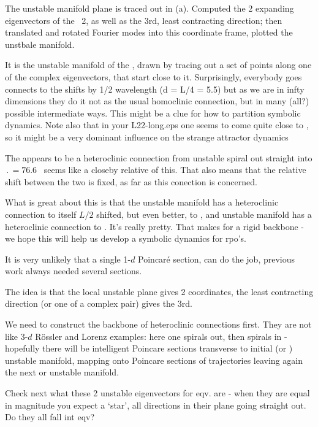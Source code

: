 The unstable manifold plane
is traced out in (a).
Computed the 2 expanding eigenvectors of the
\eqv\ {\nameit}2, as well as the 3rd, least contracting direction; then
translated and rotated Fourier modes into this coordinate frame,
plotted the unstbale manifold.


 It is the unstable manifold of the 
{\eqv}, drawn by tracing out a set of points along one of the complex
eigenvectors, that start close to it. Surprisingly, everybody goes connects
to the  shifts by 1/2 wavelength (d = L/4 = 5.5) but as we are in
infty dimensions they do it not as the usual homoclinic connection, but in
many (all?) possible intermediate ways. This might be a clue for how to
partition symbolic dynamics. Note also that in your L22-long.eps one seems
to come quite close to  {\eqv}, so it might be a very dominant
influence on the strange attractor dynamics


The appears to be a heteroclinic connection from  
{\eqv}
unstable spiral out straight into  {\eqv}
$\period{} = 76.6$ \rpo\ seems like a closeby
relative of this.
That also means that the relative shift between the two {\eqva} is
fixed, as far as this conection is concerned.

What is great about
this is that the  unstable manifold has a heteroclinic connection to itself 
$L/2$ shifted, but
even better, to , and  unstable manifold has a heteroclinic
connection to . 
It's really pretty. That makes for a rigid backbone - 
we hope this will help us develop a symbolic dynamics for rpo's.

It is very unlikely 
that a single 1-$d$ Poincar\'e section,
can do the job, 
previous work
always needed several sections.

The idea is that the local unstable plane gives 2 coordinates, the
least contracting direction (or one of a complex pair) gives the 3rd.

We need to construct the backbone of heteroclinic connections
first. They are not like 3-$d$ R\"ossler and Lorenz examples:
here one spirals out,
then spirals in - hopefully there will be intelligent Poincare sections
transverse to initial  (or ) unstable manifold, mapping onto
Poincare sections of trajectories leaving again
the next  or  unstable manifold.


Check next what these 2 unstable eigenvectors for  eqv. are - when they
are equal in magnitude you expect a `star', all directions in their plane
going straight out. Do they all fall int  eqv?

